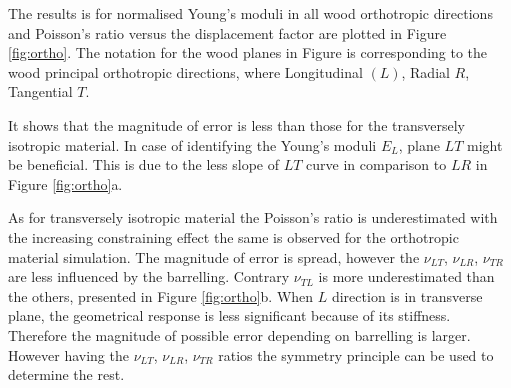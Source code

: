 \documentclass[review]{elsarticle}
\begin{document}
The results is for normalised Young's moduli in all wood orthotropic directions and Poisson's ratio versus the displacement factor are plotted in Figure \ref{fig:ortho}. The notation for the wood planes in Figure is corresponding to the wood principal orthotropic directions, where Longitudinal $(L)$, Radial $R$, Tangential $T$. \par It shows that the magnitude of error is less than those for the transversely isotropic material. 
In case of identifying the Young's moduli $E_L$, plane  $LT$ might be
beneficial. This is due to the less slope of $LT$ curve in comparison to $LR$ in
Figure \ref{fig:ortho}a. \par
As for transversely isotropic material the Poisson's ratio is underestimated
with the increasing constraining effect the same is observed for the orthotropic
material simulation. The magnitude of error is spread, however the $\nu_{LT}$,
$\nu_{LR}$, $\nu_{TR}$ are less influenced by the barrelling. Contrary
$\nu_{TL}$ is more underestimated than the others, presented in Figure
\ref{fig:ortho}b. When $L$
direction is in transverse plane, the geometrical response is less significant
because of its stiffness. Therefore the magnitude of possible error depending on
barrelling is larger. However having the $\nu_{LT}$,
$\nu_{LR}$, $\nu_{TR}$ ratios the symmetry principle can
be used to determine the rest.
\end{document}
